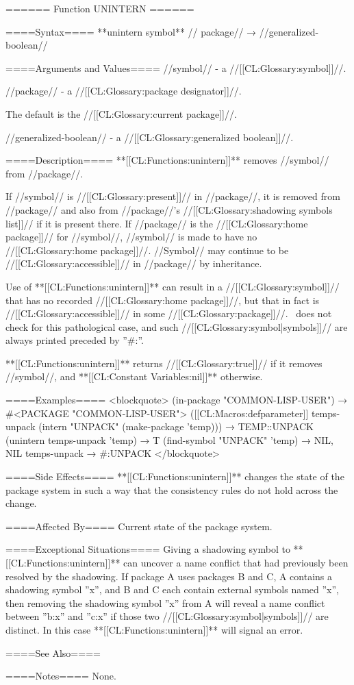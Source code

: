 ====== Function UNINTERN ======

====Syntax====
**unintern {symbol** //\opt} package// → //generalized-boolean//

====Arguments and Values====
//symbol// - a //[[CL:Glossary:symbol]]//.

//package// - a //[[CL:Glossary:package designator]]//.

The default is the //[[CL:Glossary:current package]]//.

//generalized-boolean// - a //[[CL:Glossary:generalized boolean]]//.

====Description==== **[[CL:Functions:unintern]]** removes //symbol// from //package//.

If //symbol// is //[[CL:Glossary:present]]// in //package//, it is removed from //package// and also from //package//'s //[[CL:Glossary:shadowing symbols list]]// if it is present there. If //package// is the //[[CL:Glossary:home package]]// for //symbol//, //symbol// is made to have no //[[CL:Glossary:home package]]//. //Symbol// may continue to be //[[CL:Glossary:accessible]]// in //package// by inheritance.

Use of **[[CL:Functions:unintern]]** can result in a //[[CL:Glossary:symbol]]// that has no recorded //[[CL:Glossary:home package]]//, but that in fact is //[[CL:Glossary:accessible]]// in some //[[CL:Glossary:package]]//. \clisp\ does not check for this pathological case, and such //[[CL:Glossary:symbol|symbols]]// are always printed preceded by ''#:''.

**[[CL:Functions:unintern]]** returns //[[CL:Glossary:true]]// if it removes //symbol//, and **[[CL:Constant Variables:nil]]** otherwise.

====Examples====
<blockquote> (in-package "COMMON-LISP-USER") → #<PACKAGE "COMMON-LISP-USER"> ([[CL:Macros:defparameter]] temps-unpack (intern "UNPACK" (make-package 'temp))) → TEMP::UNPACK (unintern temps-unpack 'temp) → T (find-symbol "UNPACK" 'temp) → NIL, NIL temps-unpack → #:UNPACK </blockquote>

====Side Effects====
**[[CL:Functions:unintern]]** changes the state of the package system in such a way that the consistency rules do not hold across the change.

====Affected By==== Current state of the package system.

====Exceptional Situations====
Giving a shadowing symbol to **[[CL:Functions:unintern]]** can uncover a name conflict that had previously been resolved by the shadowing. If package A uses packages B and C, A contains a shadowing symbol ''x'', and B and C each contain external symbols named ''x'', then removing the shadowing symbol ''x'' from A will reveal a name conflict between ''b:x'' and ''c:x'' if those two //[[CL:Glossary:symbol|symbols]]// are distinct. In this case **[[CL:Functions:unintern]]** will signal an error.

====See Also====
{\secref\PackageConcepts}

====Notes====
None.

